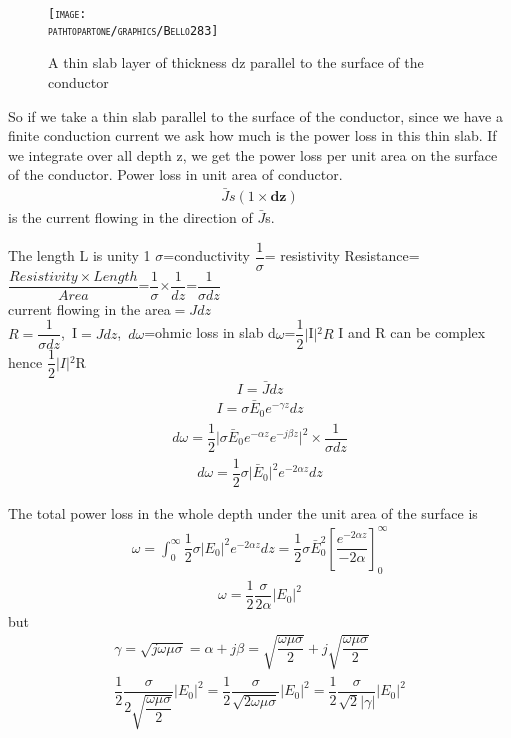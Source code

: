 \begin{figure}
\centering
\textsc{\texttt{[image: \\pathtopartone/graphics/Bello283]}}
\caption{A thin slab layer of thickness dz parallel to the surface of the conductor }
\end{figure}
So if we take a thin slab parallel to the surface of the conductor, since we have a finite conduction current we ask how much is the power loss in this thin slab. If we integrate over all depth z, we get the power loss per unit area on the surface of the conductor.
Power loss in unit area of conductor.
\begin{align*}
\bar{J}s(1\times\textbf{dz})
\end{align*}
is the current flowing in the direction of  $\bar{J}$s.
\begin{center}
The length L is unity 1
$\sigma$=conductivity
$\dfrac{1}{\sigma}$= resistivity
Resistance=$\dfrac{Resistivity \times Length}{Area}$=$\dfrac{1}{\sigma}$$\times$$\dfrac{1}{dz}$=$\dfrac{1}{\sigma dz}$\\
current flowing in the area$=Jdz$\\
$R=\dfrac{1}{\sigma dz}$,\ I$=Jdz$,\ $d\omega$=ohmic loss in slab
d$\omega$=$\dfrac{1}{2}$$\lvert$I$\rvert$$^{2}R$
I and R can be complex hence $\dfrac{1}{2}$$\lvert$$I\rvert$$^{2}$R
\begin{align*}
I=\bar{J}dz
\end{align*}
\begin{align*}
I=\sigma\bar{E}_{0}e^{-\gamma z}dz
\end{align*}
\begin{align*}
d\omega=\dfrac{1}{2}\lvert\sigma\bar{E}_{0}e^{-\alpha z}e^{-j\beta z}\rvert^{2}\times\dfrac{1}{\sigma dz}
\end{align*}
\begin{align*}
d\omega=\dfrac{1}{2}\sigma\lvert\bar{E}_{0}\rvert^{2}e^{-2\alpha z}dz
\end{align*}
\end{center}
The total power loss in the whole depth under the unit area of the surface is
\begin{align}
\omega=\int_{0}^{\infty}\dfrac{1}{2}\sigma\lvert E_{0}\rvert^{2}e^{-2\alpha z}dz=\dfrac{1}{2}\sigma\bar{E}_{0}^{2}[\dfrac{e^{-2\alpha z}}{-2\alpha}]_{0}^{\infty}
\end{align}
\begin{align}
\omega=\dfrac{1}{2}\dfrac{\sigma}{2\alpha}\lvert E_{0}\rvert^{2}
\end{align}
but
\begin{align}
\gamma=\sqrt{j\omega\mu\sigma}=\alpha+j\beta=\sqrt{\dfrac{\omega\mu\sigma}{2}}+j\sqrt{\dfrac{\omega\mu\sigma}{2}}\\
\dfrac{1}{2}\dfrac{\sigma}{2\sqrt{\dfrac{\omega\mu\sigma}{2}}}\lvert E_{0}\rvert^{2}=\dfrac{1}{2}\dfrac{\sigma}{\sqrt{2\omega\mu\sigma}}\lvert E_{0}\rvert^{2}=\dfrac{1}{2}\dfrac{\sigma}{\sqrt{2}\lvert\gamma\rvert}\lvert E_{0}\rvert^{2}
\end{align}
